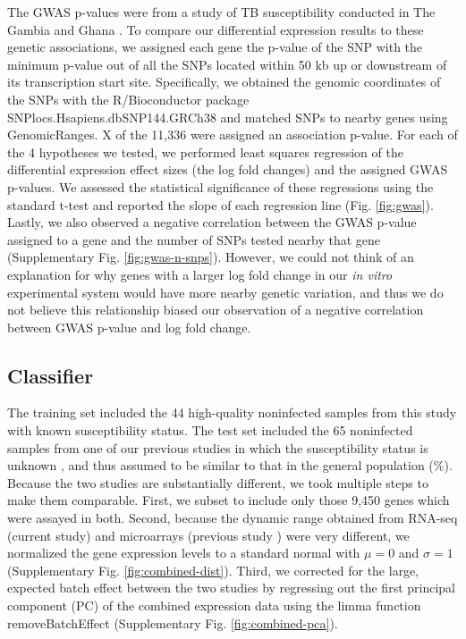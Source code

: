 \documentclass[fleqn,10pt]{wlscirep}
\begin{document}
The GWAS p-values were from a study of TB susceptibility conducted in
The Gambia and Ghana \cite{Thye2010}. To compare our differential
expression results to these genetic associations, we assigned each
gene the p-value of the SNP with the minimum p-value out of all the
SNPs located within 50 kb up or downstream of its transcription start
site. Specifically, we obtained the genomic coordinates of the SNPs
with the R/Bioconductor package SNPlocs.Hsapiens.dbSNP144.GRCh38 and
matched SNPs to nearby genes using GenomicRanges. X of the 11,336 were
assigned an association p-value. For each of the 4 hypotheses we
tested, we performed least squares regression of the differential
expression effect sizes (the log fold changes) and the assigned GWAS
p-values. We assessed the statistical significance of these
regressions using the standard t-test and reported the slope of each
regression line (Fig. \ref{fig:gwas}).  Lastly, we also observed a
negative correlation between the GWAS p-value assigned to a gene and
the number of SNPs tested nearby that gene (Supplementary Fig.
\ref{fig:gwas-n-snps}). However, we could not think of an explanation
for why genes with a larger log fold change in our \emph{in vitro}
experimental system would have more nearby genetic variation, and thus
we do not believe this relationship biased our observation of a
negative correlation between GWAS p-value and log fold change.
\subsection*{Classifier}

The training set included the 44 high-quality noninfected samples from
this study with known susceptibility status. The test set included the
65 noninfected samples from one of our previous studies in which the
susceptibility status is unknown \cite{Barreiro2012}, and thus assumed
to be similar to that in the general population (\%).
Because the two studies are substantially different, we took multiple
steps to make them comparable. First, we subset to include only those
9,450 genes which were assayed in both. Second, because the dynamic
range obtained from RNA-seq (current study) and microarrays (previous
study \cite{Barreiro2012}) were very different, we normalized the gene
expression levels to a standard normal with $\mu = 0$ and $\sigma = 1$
(Supplementary Fig. \ref{fig:combined-dist}). Third, we corrected for
the large, expected batch effect between the two studies by regressing
out the first principal component (PC) of the combined expression data
using the limma function removeBatchEffect \cite{Ritchie2015}
(Supplementary Fig. \ref{fig:combined-pca}).
\end{document}

